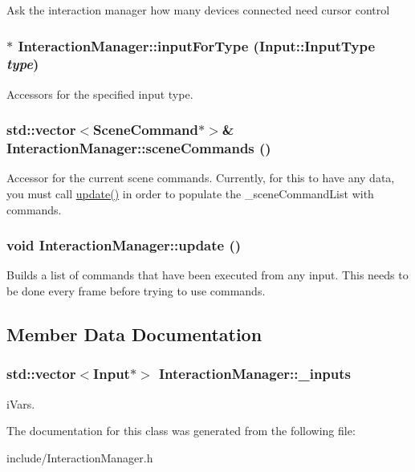 \label{class_interaction_manager_a3ce3de15f8503235dbd7ee3b911e2c96}
Ask the interaction manager how many devices connected need cursor control \hypertarget{class_interaction_manager_a5ea548125f01bdc57405680aed37a3c5}{
\subsubsection[{inputForType}]{$\ast$ InteractionManager::inputForType ({\bf Input::InputType} {\em type})}}
\label{class_interaction_manager_a5ea548125f01bdc57405680aed37a3c5}
Accessors for the specified input type. \hypertarget{class_interaction_manager_a8476cf4690ddfabcf2cdc47dbde8c58a}{
\subsubsection[{sceneCommands}]{\setlength{\rightskip}{0pt plus 5cm}std::vector$<${\bf SceneCommand}$\ast$$>$\& InteractionManager::sceneCommands ()}}
\label{class_interaction_manager_a8476cf4690ddfabcf2cdc47dbde8c58a}
Accessor for the current scene commands. Currently, for this to have any data, you must call \hyperlink{class_interaction_manager_a5bcaa27707844164bc1ff79733b85055}{update()} in order to populate the \_\-sceneCommandList with commands. \hypertarget{class_interaction_manager_a5bcaa27707844164bc1ff79733b85055}{
\subsubsection[{update}]{\setlength{\rightskip}{0pt plus 5cm}void InteractionManager::update ()}}
\label{class_interaction_manager_a5bcaa27707844164bc1ff79733b85055}
Builds a list of commands that have been executed from any input. This needs to be done every frame before trying to use commands. 

\subsection{Member Data Documentation}
\hypertarget{class_interaction_manager_ac53841738a009ffa19f735afe32ccec0}{
\subsubsection[{\_\-inputs}]{\setlength{\rightskip}{0pt plus 5cm}std::vector$<${\bf Input}$\ast$$>$ {\bf InteractionManager::\_\-inputs}}}
\label{class_interaction_manager_ac53841738a009ffa19f735afe32ccec0}
iVars. 

The documentation for this class was generated from the following file:\begin{DoxyCompactItemize}
\item 
include/InteractionManager.h\end{DoxyCompactItemize}

